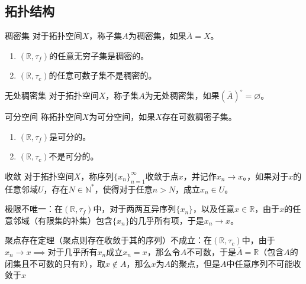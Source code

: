 \documentclass[lang = cn, scheme = chinese, thmcnt = section, usesamecnt]{elegantbook}
\newcommand{\N}{\mathbb{N}}            %
\newcommand{\R}{\mathbb{R}}            %
\begin{document}
\subsection{拓扑结构}

\begin{definition}{稠密集}
	对于拓扑空间$X$，称子集$A$为稠密集，如果$\overline{A}=X$。
\end{definition}

\begin{example}
	\begin{enumerate}
		\item $(\R,\tau_f)$的任意无穷子集是稠密的。
		\item $(\R,\tau_c)$的任意可数子集不是稠密的。
	\end{enumerate}
\end{example}

\begin{definition}{无处稠密集}
	对于拓扑空间$X$，称子集$A$为无处稠密集，如果$(\overline{A})^\circ=\varnothing$。
\end{definition}

\begin{definition}{可分空间}
	称拓扑空间$X$为可分空间，如果$X$存在可数稠密子集。
\end{definition}

\begin{example}
	\begin{enumerate}
		\item $(\R,\tau_f)$是可分的。
		\item $(\R,\tau_c)$不是可分的。
	\end{enumerate}
\end{example}

\begin{definition}{收敛}
	对于拓扑空间$X$，称序列$\{x_n\}_{n=1}^{\infty}$收敛于点$x$，并记作$x_n\to x$。，如果对于$x$的任意邻域$U$，存在$N\in\N^*$，使得对于任意$n>N$，成立$x_n\in U$。
\end{definition}

\begin{remark}
	极限不唯一：在$(\R,\tau_f)$中，对于两两互异序列$\{x_n\}$，以及任意$x\in\R$，由于$x$的任意邻域（有限集的补集）包含$\{x_n\}$的几乎所有项，于是$x_n\to x$。
\end{remark}

\begin{remark}
	聚点存在定理（聚点则存在收敛于其的序列）不成立：在$(\R,\tau_c)$中，由于$x_n\to x\implies$对于几乎所有$x_n$成立$x_n=x$，那么令$A$不可数，于是$\overline{A}=\R$（包含$A$的闭集且不可数的只有$\R$），取$x\notin A$，那么$x$为$A$的聚点，但是$A$中任意序列不可能收敛于$x$
\end{remark}
\end{document}
